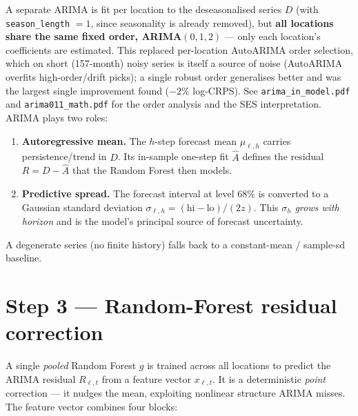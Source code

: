 \documentclass[11pt]{article}
\newcommand{\code}[1]{\texttt{\small #1}}
\begin{document}
A separate ARIMA is fit per location to the deseasonalised series $D$ (with
\code{season\_length} $=1$, since seasonality is already removed), but \textbf{all locations
share the same fixed order, ARIMA$(0,1,2)$} --- only each location's coefficients are
estimated. This replaced per-location AutoARIMA order selection, which on short (157-month)
noisy series is itself a source of noise (AutoARIMA overfits high-order/drift picks); a single
robust order generalises better and was the largest single improvement found ($-2\%$ log-CRPS).
See \code{arima\_in\_model.pdf} and \code{arima011\_math.pdf} for the order analysis and the
SES interpretation. ARIMA plays two roles:
\begin{enumerate}
\item \textbf{Autoregressive mean.} The $h$-step forecast mean $\mu_{\ell,h}$ carries
      persistence/trend in $D$. Its in-sample one-step fit $\hat A$ defines the residual
      $R=D-\hat A$ that the Random Forest then models.
\item \textbf{Predictive spread.} The forecast interval at level $68\%$ is converted to a
      Gaussian standard deviation $\sigma_{\ell,h}=(\text{hi}-\text{lo})/(2z)$. This
      $\sigma_h$ \emph{grows with horizon} and is the model's principal source of forecast
      uncertainty.
\end{enumerate}
A degenerate series (no finite history) falls back to a constant-mean / sample-sd baseline.

\section{Step 3 --- Random-Forest residual correction}

A single \emph{pooled} Random Forest $g$ is trained across all locations to predict the
ARIMA residual $R_{\ell,t}$ from a feature vector $x_{\ell,t}$. It is a deterministic
\emph{point} correction --- it nudges the mean, exploiting nonlinear structure ARIMA misses.
The feature vector combines four blocks:
\end{document}
